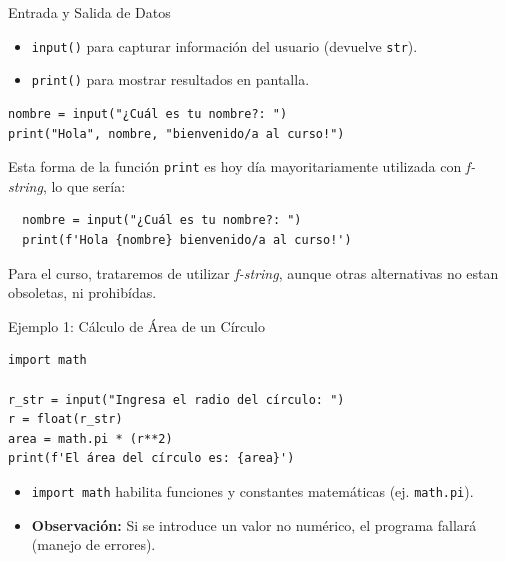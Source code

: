 \documentclass[10pt]{beamer}
\begin{document}
\begin{frame}[fragile]{Entrada y Salida de Datos}
\begin{itemize}
  \item \texttt{input()} para capturar información del usuario (devuelve \texttt{str}).
  \item \texttt{print()} para mostrar resultados en pantalla.
\end{itemize}
\begin{verbatim}
nombre = input("¿Cuál es tu nombre?: ")
print("Hola", nombre, "bienvenido/a al curso!")
\end{verbatim}

Esta forma de la función \texttt{print} es hoy día mayoritariamente utilizada con \textit{f-string}, lo que sería:

\begin{verbatim}
  nombre = input("¿Cuál es tu nombre?: ")
  print(f'Hola {nombre} bienvenido/a al curso!')
  \end{verbatim}

  Para el curso, trataremos de utilizar \textit{f-string}, aunque otras alternativas no estan obsoletas, ni prohibídas.
\end{frame}

\begin{frame}[fragile]{Ejemplo 1: Cálculo de Área de un Círculo}
\begin{verbatim}
import math

r_str = input("Ingresa el radio del círculo: ")
r = float(r_str)
area = math.pi * (r**2)
print(f'El área del círculo es: {area}')
\end{verbatim}
\begin{itemize}
  \item \texttt{import math} habilita funciones y constantes matemáticas (ej. \texttt{math.pi}).
  \item \textbf{Observación:} Si se introduce un valor no numérico, el programa fallará (manejo de errores).
\end{itemize}
\end{frame}
\end{document}

